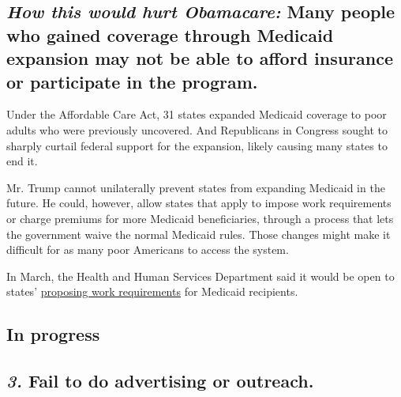 \hypertarget{how-this-would-hurt-obamacare-many-people-who-gained-coverage-through-medicaid-expansion-may-not-be-able-to-afford-insurance-or-participate-in-the-program}{%
\subsection{\texorpdfstring{\emph{How this would hurt Obamacare:} Many
people who gained coverage through Medicaid expansion may not be able to
afford insurance or participate in the
program.}{How this would hurt Obamacare: Many people who gained coverage through Medicaid expansion may not be able to afford insurance or participate in the program.}}\label{how-this-would-hurt-obamacare-many-people-who-gained-coverage-through-medicaid-expansion-may-not-be-able-to-afford-insurance-or-participate-in-the-program}}

Under the Affordable Care Act, 31 states expanded Medicaid coverage to
poor adults who were previously uncovered. And Republicans in Congress
sought to sharply curtail federal support for the expansion, likely
causing many states to end it.

Mr. Trump cannot unilaterally prevent states from expanding Medicaid in
the future. He could, however, allow states that apply to impose work
requirements or charge premiums for more Medicaid beneficiaries, through
a process that lets the government waive the normal Medicaid rules.
Those changes might make it difficult for as many poor Americans to
access the system.

In March, the Health and Human Services Department said it would be open
to states'
\href{https://www.hhs.gov/healthcare/empowering-patients/providing-relief-right-now-for-patients/making-medicaid-work-for-patients-and-states/index.html}{proposing
work requirements} for Medicaid recipients.

\hypertarget{in-progress-2}{%
\subsection{In progress}\label{in-progress-2}}

\hypertarget{3-fail-to-do-advertising-or-outreach}{%
\subsection{\texorpdfstring{\emph{\textbf{3.}} \textbf{Fail to do
advertising or
outreach.}}{3. Fail to do advertising or outreach.}}\label{3-fail-to-do-advertising-or-outreach}}

